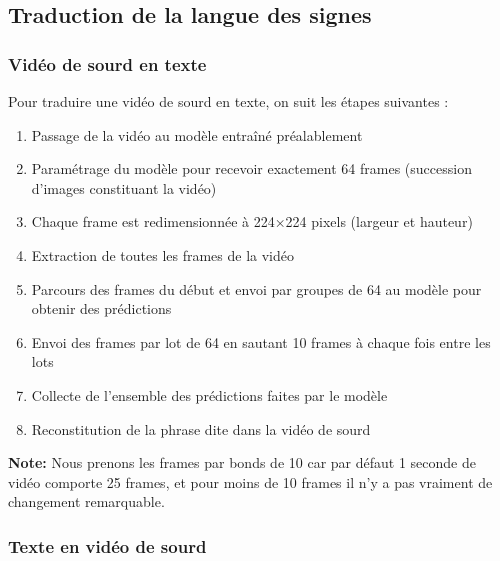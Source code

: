 \subsection{Traduction de la langue des signes}

\subsubsection{Vidéo de sourd en texte}

\begin{tcolorbox}[
  colback=gray!5,
  colframe=gray!40,
  arc=3mm,
  title={\textbf{Algorithme de traduction vidéo de sourd en texte}},
  fonttitle=\sffamily\bfseries
]
Pour traduire une vidéo de sourd en texte, on suit les étapes suivantes :

\begin{enumerate}
  \item Passage de la vidéo au modèle entraîné préalablement
  \item Paramétrage du modèle pour recevoir exactement 64 frames (succession d'images constituant la vidéo) 
  \item Chaque frame est redimensionnée à 224×224 pixels (largeur et hauteur)
  \item Extraction de toutes les frames de la vidéo
  \item Parcours des frames du début et envoi par groupes de 64 au modèle pour obtenir des prédictions
  \item Envoi des frames par lot de 64 en sautant 10 frames à chaque fois entre les lots
  \item Collecte de l'ensemble des prédictions faites par le modèle
  \item Reconstitution de la phrase dite dans la vidéo de sourd
\end{enumerate}

\textbf{Note:} Nous prenons les frames par bonds de 10 car par défaut 1 seconde de vidéo comporte 25 frames, 
et pour moins de 10 frames il n'y a pas vraiment de changement remarquable.
\end{tcolorbox}

\vspace{0.5cm}

\subsubsection{Texte en vidéo de sourd}

